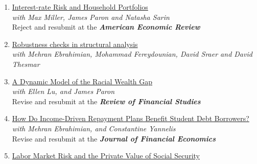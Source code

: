 \documentclass[6pt,letterpaper]{article}
\begin{document}
\begin{enumerate} 
	\item \href{https://www.dropbox.com/s/uflamzv0ii7tge0/CMPS.pdf?dl=0}{Interest-rate Risk and Household Portfolios} \vspace{.1cm} \\
	{\small  \textit{with Max Miller, James Paron and Natasha Sarin} } \vspace{.1cm}\\
	{\small  Reject and resubmit at the \textit{\textbf{American Economic Review}} } \vspace{.1cm} 
	\item \href{https://www.dropbox.com/s/rolu4h2zn20ff1q/RobustnessCheck.pdf?dl=0}{Robustness checks in structural analysis} \vspace{.1cm} \\
	{\small  \textit{with Mehran Ebrahimian, Mohammad Fereydounian, David Sraer and David Thesmar} } \vspace{.1cm} 
	\item \href{https://www.dropbox.com/scl/fi/y0q6fvrcajwjvb5isys24/CLP.pdf?rlkey=9p1mhyzkbrl05prwei35t1umf&e=1&dl=0}{A Dynamic Model of the Racial Wealth Gap} \vspace{.1cm} \\
	{\small  \textit{with Ellen Lu, and James Paron} } \vspace{.1cm} \\
	{\small  Revise and resubmit at the \textit{\textbf{Review of Financial Studies}} } \vspace{.1cm} 
	\item \href{https://www.dropbox.com/scl/fi/fii4hpjjhxmdumerqslin/CEY.pdf?rlkey=qlvp06iuxffnu7lf3ohokz0d5&dl=0}{How Do Income-Driven Repayment Plans Benefit Student Debt Borrowers?} \vspace{.1cm} \\
	{\small  \textit{with Mehran Ebrahimian, and Constantine Yannelis} } \vspace{.1cm} \\ 
	{\small  Revise and resubmit at the \textit{\textbf{Journal of Financial Economics}} } \vspace{.1cm} 
	\item \href{https://papers.ssrn.com/sol3/papers.cfm?abstract_id=2564431}{Labor Market Risk and the Private Value of Social Security} \vspace{0.1cm} \\ 
\end{enumerate}
\end{document}
